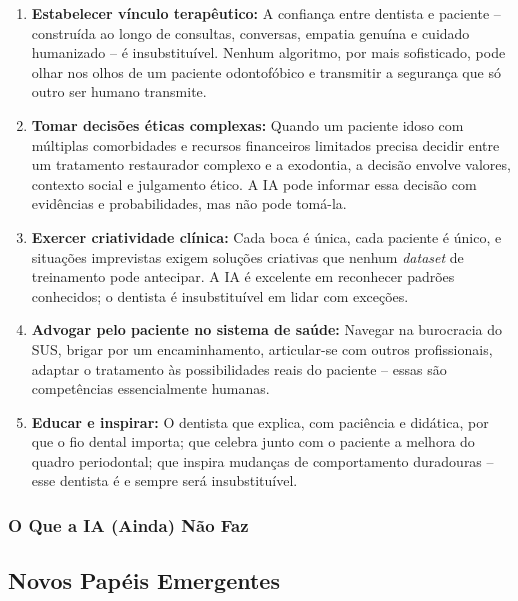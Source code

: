 \begin{enumerate}
  \item \textbf{Estabelecer vínculo terapêutico:} A confiança entre dentista e
    paciente -- construída ao longo de consultas, conversas, empatia genuína e
    cuidado humanizado -- é insubstituível. Nenhum algoritmo, por mais
    sofisticado, pode olhar nos olhos de um paciente odontofóbico e transmitir
    a segurança que só outro ser humano transmite.

  \item \textbf{Tomar decisões éticas complexas:} Quando um paciente idoso com
    múltiplas comorbidades e recursos financeiros limitados precisa decidir
    entre um tratamento restaurador complexo e a exodontia, a decisão envolve
    valores, contexto social e julgamento ético. A IA pode informar essa
    decisão com evidências e probabilidades, mas não pode tomá-la.

  \item \textbf{Exercer criatividade clínica:} Cada boca é única, cada paciente
    é único, e situações imprevistas exigem soluções criativas que nenhum
    \textit{dataset} de treinamento pode antecipar. A IA é excelente em
    reconhecer padrões conhecidos; o dentista é insubstituível em lidar com
    exceções.

  \item \textbf{Advogar pelo paciente no sistema de saúde:} Navegar na
    burocracia do SUS, brigar por um encaminhamento, articular-se com outros
    profissionais, adaptar o tratamento às possibilidades reais do paciente --
    essas são competências essencialmente humanas.

  \item \textbf{Educar e inspirar:} O dentista que explica, com paciência e
    didática, por que o fio dental importa; que celebra junto com o paciente
    a melhora do quadro periodontal; que inspira mudanças de comportamento
    duradouras -- esse dentista é e sempre será insubstituível.
\end{enumerate}

\subsubsection{O Que a IA (Ainda) Não Faz}

\subsection{Novos Papéis Emergentes}

